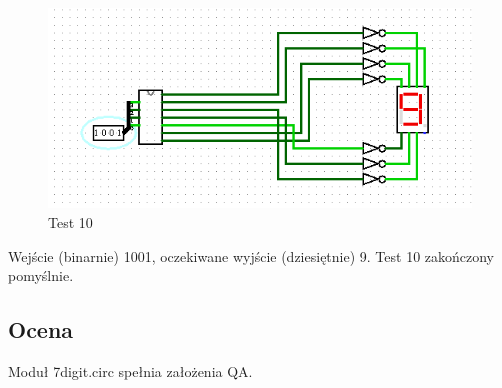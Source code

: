 \begin{figure}[H]
    \includegraphics[width=\linewidth]{ScreenshotsTests/Comp 1/Comp 1_00000.png}
    \caption{Test 10}
    \label{fig:test9}
\end{figure}

Wejście (binarnie) 1001, oczekiwane wyjście (dziesiętnie) 9.\newline
Test 10 zakończony pomyślnie.

\subsection{Ocena}\label{subsec:qa-review}
Moduł 7digit.circ spełnia założenia QA.